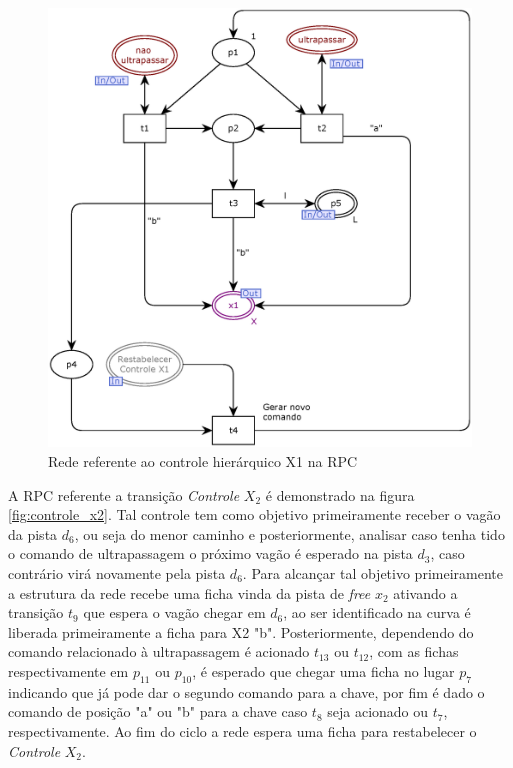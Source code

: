 \begin{figure}[ht]
    \centering
    \caption{Rede referente ao controle hierárquico X1 na RPC}
    \label{fig:controle_x1}
    \includegraphics[width=0.8\linewidth]{figures//Simulation//Modelagem/controle_x1.eps}
\end{figure}

A RPC referente a transição \textit{Controle} $X_2$ é demonstrado na figura \ref{fig:controle_x2}. Tal controle tem como objetivo primeiramente receber o vagão da pista $d_6$, ou seja do menor caminho e posteriormente, analisar caso tenha tido o comando de ultrapassagem o próximo vagão é esperado na pista $d_3$, caso contrário virá novamente pela pista $d_6$. Para alcançar tal objetivo primeiramente a estrutura da rede recebe uma ficha vinda da pista de \textit{free} $x_2$ ativando a transição $t_9$ que espera o vagão chegar em $d_6$, ao ser identificado na curva é liberada primeiramente a ficha para X2 "b". Posteriormente, dependendo do comando relacionado à ultrapassagem é acionado $t_13$ ou $t_12$, com as fichas respectivamente em $p_11$ ou $p_10$, é esperado que chegar uma ficha no lugar $p_7$ indicando que já pode dar o segundo comando para a chave, por fim é dado o comando de posição "a" ou "b" para a chave caso $t_8$ seja acionado ou $t_7$, respectivamente. Ao fim do ciclo a rede espera uma ficha para restabelecer o \textit{Controle} $X_2$.

